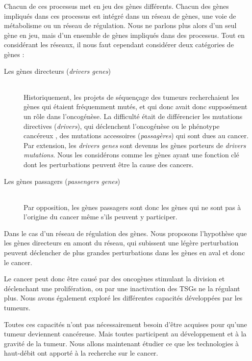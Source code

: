       Chacun de ces processus met en jeu des gènes différents.
      Chacun des gènes impliqués dans ces processus est intégré dans un réseau de gènes, une voie de métabolisme ou un réseau de régulation.
      Nous ne parlons plus alors d'un seul gène en jeu, mais d'un ensemble de gènes impliqués dans des processus.
      Tout en considérant les réseaux, il nous faut cependant considérer deux catégories de gènes :
      \begin{description}
        \item [Les gènes directeurs (\emph{drivers genes})]    \hfill \\
          Historiquement, les projets de séquençage des tumeurs recherchaient les gènes qui étaient fréquemment mutés, et qui donc avait donc supposément un rôle dans l'oncogénèse.
          La difficulté était de différencier les mutations directives (\emph{drivers}), qui déclenchent l'oncogénèse ou le phénotype cancéreux \citep{Greenman2006, Sjoblom2006, Wood2007}, des mutations accessoires (\emph{passagères}) qui sont dues au cancer.
          Par extension, les \emph{drivers genes} sont devenus les gènes porteurs de \emph{drivers mutations}.
          Nous les considérons comme les gènes ayant une fonction clé dont les perturbations peuvent être la cause des cancers.
        \item [Les gènes passagers (\emph{passengers genes})] \hfill \\
          Par opposition, les gènes passagers sont donc les gènes qui ne sont pas à l'origine du cancer même s'ils peuvent y participer.
      \end{description}
      \vspace{1.5ex}

      Dans le cas d'un réseau de régulation des gènes. Nous proposons l'hypothèse que les gènes directeurs en amont du réseau, qui subissent une légère perturbation peuvent déclencher de plus grandes perturbations dans les gènes en aval et donc le cancer.

      Le cancer peut donc être causé par des oncogènes stimulant la division et déclenchant une prolifération, ou par une inactivation des \acp{TSG} ne la régulant plus.
      Nous avons également exploré les différentes capacités développées par les tumeurs.

      Toutes ces capacités n'ont pas nécessairement besoin d'être acquises pour qu'une tumeur deviennent cancéreuse.
      Mais toutes participent au développement et à la gravité de la tumeur.
      Nous allons maintenant étudier ce que les technologies à haut-débit ont apporté à la recherche sur le cancer.

